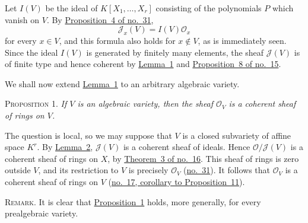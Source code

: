 Let $I(V)$ be the ideal of $K[X_1,\ldots,X_r]$ consisting of the polynomials $P$ which vanish on $V$. By \hyperref[fac:II:1:no:31:prop:4]{Proposition~4 of no.~31},
\[
\mathcal{J}_x(V)=I(V)\mathcal{O}_x
\]
for every $x\in V$, and this formula also holds for $x\notin V$, as is immediately seen. Since the ideal $I(V)$ is generated by finitely many elements, the sheaf $\mathcal{J}(V)$ is of finite type and hence coherent by \hyperref[fac:II:2:no:37:lemma:1]{Lemma~1} and \hyperref[fac:I:2:no:15:prop:8]{Proposition~8 of no.~15}.

We shall now extend \hyperref[fac:II:2:no:37:lemma:1]{Lemma~1} to an arbitrary algebraic variety.

\label{fac:II:2:no:37:prop:1}
\textsc{Proposition 1.} \textit{If $V$ is an algebraic variety, then the sheaf $\mathcal{O}_V$ is a coherent sheaf of rings on $V$.}

The question is local, so we may suppose that $V$ is a closed subvariety of affine space $K^r$. By \hyperref[fac:II:2:no:37:lemma:2]{Lemma~2}, $\mathcal{J}(V)$ is a coherent sheaf of ideals. Hence $\mathcal{O}/\mathcal{J}(V)$ is a coherent sheaf of rings on $X$, by \hyperref[fac:I:2:no:16:thm:3]{Theorem~3 of no.~16}. This sheaf of rings is zero outside $V$, and its restriction to $V$ is precisely $\mathcal{O}_V$ (\hyperref[fac:II:1:no:31]{no.~31}). It follows that $\mathcal{O}_V$ is a coherent sheaf of rings on $V$ (\hyperref[fac:I:2:no:17:prop:11:cor]{no.~17, corollary to Proposition~11}).

\label{fac:II:2:no:37:remark}
\textsc{Remark.} It is clear that \hyperref[fac:II:2:no:37:prop:1]{Proposition~1} holds, more generally, for every prealgebraic variety.
